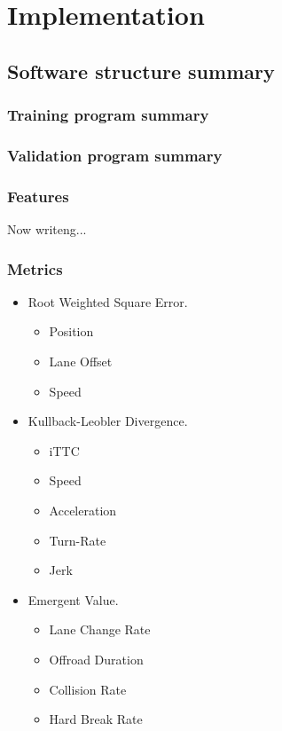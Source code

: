 \chapter{Implementation}
\label{chapter:Implementation}


\section{Software structure summary}

\subsection{Training program summary}

\subsection{Validation program summary}



\subsection{Features}

Now writeng...

\subsection{Metrics}

\begin{itemize}
\item Root Weighted Square Error.
\begin{itemize}
\item Position
\item Lane Offset
\item Speed
\end{itemize}
\item Kullback-Leobler Divergence.
\begin{itemize}
\item iTTC
\item Speed
\item Acceleration
\item Turn-Rate
\item Jerk
\end{itemize}
\item Emergent Value.
\begin{itemize}
\item Lane Change Rate
\item Offroad Duration
\item Collision Rate
\item Hard Break Rate
\end{itemize}
\end{itemize}

